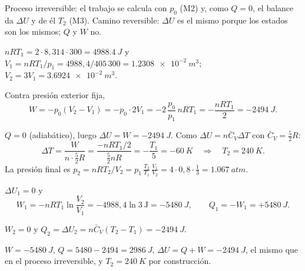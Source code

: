 \begin{resolucion}
\idea Proceso irreversible: el trabajo se calcula con $p_0$ (M2) y, como $Q=0$, el balance da $\Delta U$ y de él
$T_2$ (M3). Camino reversible: $\Delta U$ es el mismo porque los estados son los mismos; $Q$ y $W$ no.

 $nRT_1=2\cdot8{,}314\cdot300=\SI{4988,4}{J}$ y
$V_1=nRT_1/p_1=4988{,}4/405\,300=\SI{1,2308e-2}{m^3}$; $V_2=3V_1=\SI{3,6924e-2}{m^3}$.

 Contra presión exterior fija,
\[
  W=-p_0(V_2-V_1)=-p_0\cdot2V_1=-2\,\frac{p_0}{p_1}\,nRT_1=-\frac{nRT_1}{2}=\boxed{-\SI{2494}{J}}.
\]

 $Q=0$ (adiabático), luego $\Delta U=W=-\SI{2494}{J}$. Como
$\Delta U=n\bar C_V\Delta T$ con $\bar C_V=\tfrac52R$:
\[
  \Delta T=\frac{W}{n\cdot\frac52R}=\frac{-nRT_1/2}{\frac52nR}=-\frac{T_1}{5}=-\SI{60}{K}
  \quad\Longrightarrow\quad\boxed{T_2=\SI{240}{K}}.
\]
La presión final es $p_2=nRT_2/V_2=p_1\,\frac{T_2}{T_1}\,\frac{V_1}{V_2}=4\cdot0{,}8\cdot\tfrac13=\SI{1,067}{atm}$.

 $\Delta U_1=0$ y
\[
  W_1=-nRT_1\ln\frac{V_2}{V_1}=-4988{,}4\ln3\ \mathrm J=-\SI{5480}{J},\qquad Q_1=-W_1=+\SI{5480}{J}.
\]

 $W_2=0$ y $Q_2=\Delta U_2=n\bar C_V(T_2-T_1)=-\SI{2494}{J}$.

 $W=-\SI{5480}{J}$, $Q=5480-2494=\SI{2986}{J}$, $\Delta U=Q+W=\boxed{-\SI{2494}{J}}$,
el mismo que en el proceso irreversible, y $T_2=\SI{240}{K}$ por construcción.
\end{resolucion}

